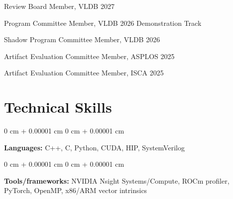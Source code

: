\documentclass[10pt, letterpaper]{article}
\newenvironment{onecolentry}{
    \begin{adjustwidth}{
        0 cm + 0.00001 cm
    }{
        0 cm + 0.00001 cm
    }
}{
    \end{adjustwidth}
} %
\begin{document}
    Review Board Member, VLDB 2027
    
    Program Committee Member, VLDB 2026 Demonstration Track
    
    Shadow Program Committee Member, VLDB 2026
    
    Artifact Evaluation Committee Member, ASPLOS 2025
    
    Artifact Evaluation Committee Member, ISCA 2025

    
    \section{Technical Skills}


        \begin{onecolentry}
            \textbf{Languages:} C++, C, Python, CUDA, HIP, SystemVerilog
        \end{onecolentry}

        \vspace{0.2 cm}

        \begin{onecolentry}
            \textbf{Tools/frameworks:} NVIDIA Nsight Systems/Compute, ROCm profiler, PyTorch, OpenMP, x86/ARM vector intrinsics
        \end{onecolentry}


    
\end{document}
